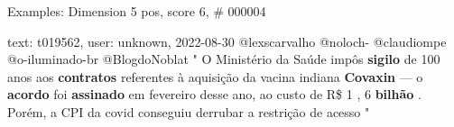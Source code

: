 \begin{frame}{Examples: Dimension 5 pos, score 6, \# 000004}
\footnotesize
\begin{exampleblock}{text: t019562, user: unknown, 2022-08-30}
@lexscarvalho @noloch- @claudiompe @o-iluminado-br @BlogdoNoblat " O Ministério 
da Saúde impôs \textbf{sigilo} de 100 anos aos \textbf{contratos} referentes à 
aquisição da vacina indiana \textbf{Covaxin} — o \textbf{acordo} foi 
\textbf{assinado} em fevereiro desse ano, ao custo de R\$ 1 , 6 \textbf{bilhão} 
. Porém, a CPI da covid conseguiu derrubar a restrição de acesso " 
\end{exampleblock}
\end{frame}
